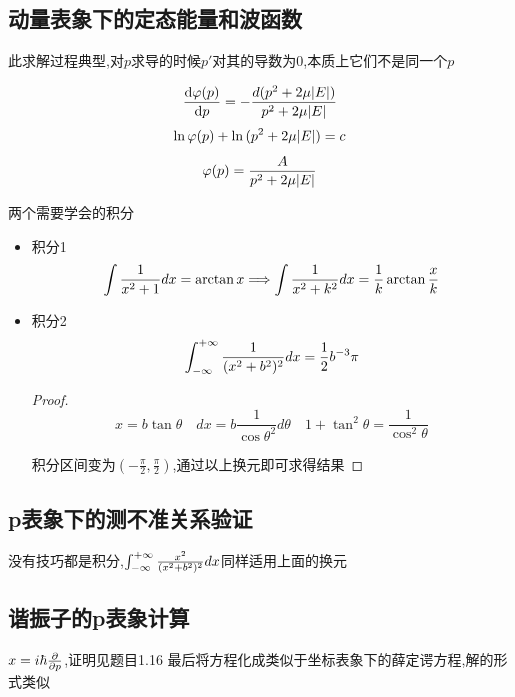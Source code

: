         \subsection{动量表象下的定态能量和波函数}
            此求解过程典型,对$p$求导的时候$p'$对其的导数为$0$,本质上它们不是同一个$p$
            
            $$ \dv{\varphi(p)}{p} = - \frac{d(p^{2}+2\mu \abs{E})}{p^{2}+2\mu \abs{E}} $$
            $$ \ln{\varphi(p)}+\ln{(p^{2}+2\mu \abs{E})} = c                           $$
            $$ \varphi(p) = \frac{A}{p^{2}+2\mu \abs{E}}                               $$

            \begin{formal}
                
                两个需要学会的积分
                \begin{itemize}
                    \item 积分1
                        $$\int \frac{1}{x^{2}+1} dx  = \arctan{x} \Longrightarrow \int \frac{1}{x^{2}+k^{2}} dx = \frac{1}{k} \arctan{\frac{x}{k}} $$
                    \item 积分2
                        $$ \int_{-\infty}^{+\infty} \frac{1}{(x^{2}+b^{2})^{2}} dx = \frac{1}{2} b^{-3} \pi $$
    
                    \begin{proof}
                        \pfindent
                        $$ x = b\tan{\theta} \quad dx = b \frac{1}{\cos{\theta}^{2}} d\theta \quad 1+\tan^{2}{\theta} = \frac{1}{\cos^{2}{\theta}} $$

                        积分区间变为$ (-\frac{\pi}{2},\frac{\pi}{2}) $,通过以上换元即可求得结果
                    \end{proof}

                \end{itemize}
            \end{formal}
            
        \subsection{p表象下的测不准关系验证}
            没有技巧都是积分,$\int_{-\infty}^{+\infty} \frac{x^{2}}{(x^{2}+b^{2})^{2}} dx $同样适用上面的换元        

        \subsection{谐振子的p表象计算}
            $ x = i\hbar \pdv{p}$,证明见题目1.16
            最后将方程化成类似于坐标表象下的薛定谔方程,解的形式类似

